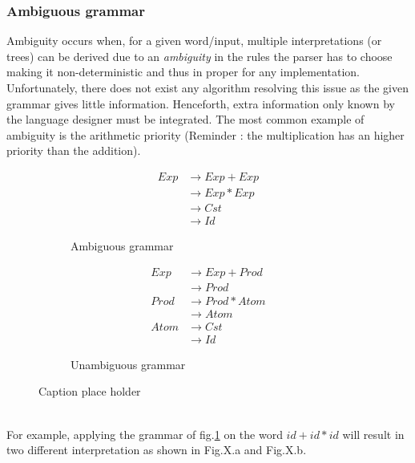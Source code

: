 \documentclass[a4paper,11pt]{article}
\begin{document}
      \subsubsection{Ambiguous grammar}
        Ambiguity occurs when, for a given word/input, multiple interpretations (or trees) can be derived due to an \textit{ambiguity} in the rules the parser has to choose making it non-deterministic and thus in proper for any implementation. Unfortunately, there does not exist any algorithm resolving this issue as the given grammar gives little information. Henceforth, extra information only known by the language designer must be integrated. The most common example of ambiguity is the arithmetic priority (Reminder : the multiplication has an higher priority than the addition).
        \begin{figure}[h!]
          \centering
          \begin{subfigure}[b]{0.4\textwidth}
              \centering
              \begin{align}
                Exp &\rightarrow Exp+Exp \\
                    &\rightarrow Exp*Exp \\
                    &\rightarrow Cst \\
                    &\rightarrow Id
              \end{align}
              \caption{Ambiguous grammar}
              \label{fig:unmodifiedgrammar3}
          \end{subfigure}%
          \begin{subfigure}[b]{0.4\textwidth}
              \centering
              \begin{align}
                Exp  &\rightarrow Exp+Prod \\
                     &\rightarrow Prod \\
                Prod &\rightarrow Prod*Atom \\
                     &\rightarrow Atom \\
                Atom &\rightarrow Cst \\
                     &\rightarrow Id
              \end{align}
              \caption{Unambiguous grammar}
              \label{fig:unambiguousgrammar3}
          \end{subfigure}
          \caption{Caption place holder}
      \end{figure}\\
      For example, applying the grammar of fig.\ref{fig:unmodifiedgrammar3} on the word $id+id*id$ will result in two different interpretation as shown in Fig.X.a and Fig.X.b.
\end{document}
